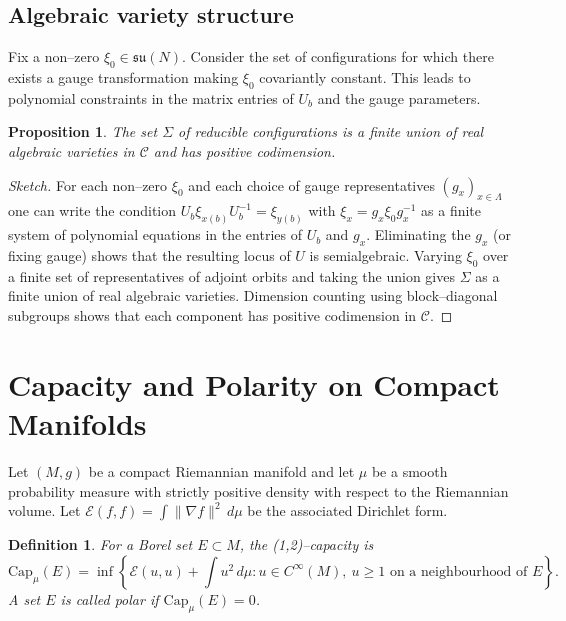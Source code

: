 \documentclass[11pt]{article}
\newtheorem{proposition}[theorem]{Proposition}
\newtheorem{definition}[theorem]{Definition}
\begin{document}
\subsection{Algebraic variety structure}

Fix a non--zero $\xi_0\in\mathfrak{su}(N)$. Consider the set of
configurations for which there exists a gauge transformation making
$\xi_0$ covariantly constant. This leads to polynomial constraints in
the matrix entries of $U_b$ and the gauge parameters.

\begin{proposition}
The set $\Sigma$ of reducible configurations is a finite union of real
algebraic varieties in $\mathcal{C}$ and has positive codimension.
\end{proposition}

\begin{proof}[Sketch]
For each non--zero $\xi_0$ and each choice of gauge representatives
$(g_x)_{x\in\Lambda}$ one can write the condition
$U_b\xi_{x(b)}U_b^{-1}=\xi_{y(b)}$ with $\xi_x = g_x\xi_0g_x^{-1}$ as a
finite system of polynomial equations in the entries of $U_b$ and
$g_x$. Eliminating the $g_x$ (or fixing gauge) shows that the resulting
locus of $U$ is semialgebraic. Varying $\xi_0$ over a finite set of
representatives of adjoint orbits and taking the union gives $\Sigma$ as
a finite union of real algebraic varieties. Dimension counting using
block--diagonal subgroups shows that each component has positive
codimension in $\mathcal{C}$.
\end{proof}

\section{Capacity and Polarity on Compact Manifolds}

Let $(M,g)$ be a compact Riemannian manifold and let $\mu$ be a smooth
probability measure with strictly positive density with respect to the
Riemannian volume. Let $\mathcal{E}(f,f) = \int\|\nabla f\|^2\,d\mu$ be
the associated Dirichlet form.

\begin{definition}
For a Borel set $E\subset M$, the (1,2)--capacity is
\begin{equation}
  \mathrm{Cap}_\mu(E)
  = \inf\left\{\mathcal{E}(u,u) + \int u^2\,d\mu :
    u\in C^\infty(M),\ u\ge 1 \text{ on a neighbourhood of }E\right\}.
\end{equation}
A set $E$ is called \emph{polar} if $\mathrm{Cap}_\mu(E)=0$.
\end{definition}
\end{document}
